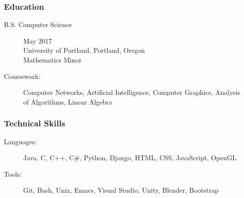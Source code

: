 \documentclass{article}
\begin{document}
\subsubsection*{Education}
    \begin{description}
        \item[B.S. Computer Science] \hfill 
        May 2017\\
        University of Portland, Portland, Oregon\\
        Mathematics Minor

        \vspace{0.5em}

        \item[Coursework:]
            Computer Networks, 
            Artificial Intelligence, 
            Computer Graphics, 
            Analysis of Algorithms,
            Linear Algebra
    \end{description}



\subsubsection*{Technical Skills}
    \begin{description}    
        \item[Languages:] 
            Java, 
            C, 
            C++, 
            C\#, 
            Python, 
            Django, 
            HTML, 
            CSS, 
            JavaScript, 
            OpenGL

            \vspace{0.5em}

        \item[Tools:] 
            Git, 
            Bash, 
            Unix, 
            Emacs, 
            Visual Studio, 
            Unity, 
            Blender, 
            Bootstrap

    \end{description}
\end{document}
